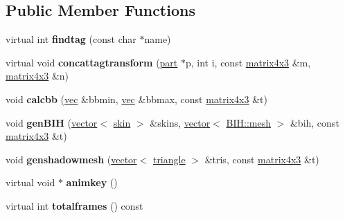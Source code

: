 \subsection*{Public Member Functions}
\begin{DoxyCompactItemize}
\item 
\mbox{\label{structanimmodel_1_1meshgroup_a8547cce3717e205984738cc2b17e7b1f}} 
virtual int {\bfseries findtag} (const char $\ast$name)
\item 
\mbox{\label{structanimmodel_1_1meshgroup_aa874289535bd369dea840b60dfdf3a87}} 
virtual void {\bfseries concattagtransform} (\hyperlink{structanimmodel_1_1part}{part} $\ast$p, int i, const \hyperlink{structmatrix4x3}{matrix4x3} \&m, \hyperlink{structmatrix4x3}{matrix4x3} \&n)
\item 
\mbox{\label{structanimmodel_1_1meshgroup_ad6edbf2e4df1b38f71240f65acd7fea5}} 
void {\bfseries calcbb} (\hyperlink{structvec}{vec} \&bbmin, \hyperlink{structvec}{vec} \&bbmax, const \hyperlink{structmatrix4x3}{matrix4x3} \&t)
\item 
\mbox{\label{structanimmodel_1_1meshgroup_ac381f1c88f65c0a1813e0a0e129a5418}} 
void {\bfseries gen\+B\+IH} (\hyperlink{structvector}{vector}$<$ \hyperlink{structanimmodel_1_1skin}{skin} $>$ \&skins, \hyperlink{structvector}{vector}$<$ \hyperlink{struct_b_i_h_1_1mesh}{B\+I\+H\+::mesh} $>$ \&bih, const \hyperlink{structmatrix4x3}{matrix4x3} \&t)
\item 
\mbox{\label{structanimmodel_1_1meshgroup_a56e65b227eb235f1eaf5ccf83218717e}} 
void {\bfseries genshadowmesh} (\hyperlink{structvector}{vector}$<$ \hyperlink{structtriangle}{triangle} $>$ \&tris, const \hyperlink{structmatrix4x3}{matrix4x3} \&t)
\item 
\mbox{\label{structanimmodel_1_1meshgroup_ae8caea7c9756f781c678e6f97a42fd53}} 
virtual void $\ast$ {\bfseries animkey} ()
\item 
\mbox{\label{structanimmodel_1_1meshgroup_a578f38fc290a1afd59cdd41243cccbce}} 
virtual int {\bfseries totalframes} () const

\end{DoxyCompactItemize}
